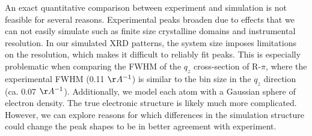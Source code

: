 \documentclass[journal=jpcbfk,manuscript=article]{achemso}
\begin{document}
  An exact quantitative comparison between experiment and simulation is not feasible for several reasons. 
  Experimental peaks broaden due to effects that we can not easily simulate such
  as finite size crystalline domains and instrumental resolution. In our simulated
  XRD patterns, the system size imposes limitations on the resolution, which makes
  it difficult to reliably fit peaks. This is especially problematic when comparing
  the FWHM of the $q_z$ cross-section of R-$\pi$, where the experimental FWHM 
  (0.11 $\AA^{-1}$) is similar to the bin size in the $q_z$ direction (ca. 0.07 $\AA^{-1}$).
  Additionally, we model each atom with a Gaussian sphere of electron density. 
  The true electronic structure is likely much more complicated. However, we can
  explore reasons for which differences in the simulation structure could change
  the peak shapes to be in better agreement with experiment.
  
  
  
\end{document}
